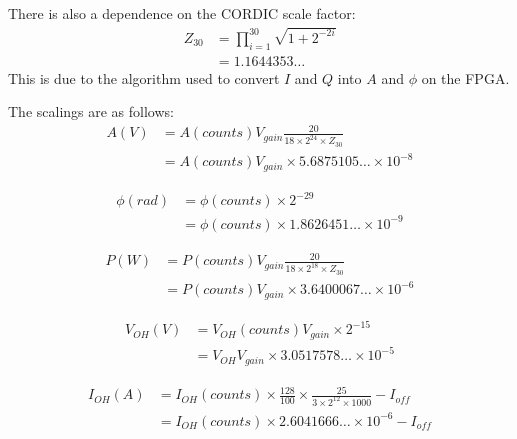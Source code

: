 \documentclass[12pt,a4paper]{article}
\begin{document}
There is also a dependence on the CORDIC scale factor:
\begin{equation}
  \label{equ:cordic}
  \begin{split}
    Z_{30} &= \prod_{i=1}^{30}\sqrt{1 + 2^{-2i}} \\
    &= 1.1644353\ldots
  \end{split}
\end{equation}
This is due to the algorithm used to convert $I$ and $Q$ into $A$ and $\phi$ on the FPGA\@.

The scalings are as follows:
\begin{equation}
  \label{equ:avolts}
  \begin{split}
    A(V) &= A(counts) V_{gain} \frac{20}{18 \times 2^{24} \times Z_{30}} \\
    &= A(counts) V_{gain} \times 5.6875105\ldots \times 10^{-8}
  \end{split}
\end{equation}

\begin{equation}
  \label{equ:phirad}
  \begin{split}
    \phi(rad) &= \phi(counts) \times 2^{-29} \\
    &= \phi(counts) \times 1.8626451\ldots \times 10^{-9}
  \end{split}
\end{equation}

\begin{equation}
  \label{equ:pwatts}
  \begin{split}
    P(W) &= P(counts) V_{gain} \frac{20}{18 \times 2^{18} \times Z_{30}} \\
    &= P(counts) V_{gain} \times 3.6400067\ldots \times 10^{-6}
  \end{split}
\end{equation}

\begin{equation}
  \label{equ:vdcvolts}
  \begin{split}
    V_{OH}(V) &= V_{OH}(counts) V_{gain} \times 2^{-15} \\
    &= V_{OH} V_{gain} \times 3.0517578\ldots \times 10^{-5}
  \end{split}
\end{equation}

\begin{equation}
  \label{equ:curramps}
  \begin{split}
    I_{OH}(A) &= I_{OH}(counts) \times \frac{128}{100} \times \frac{25}{3 \times 2^{12} \times 1000} - I_{off} \\
    &= I_{OH}(counts) \times 2.6041666\ldots \times 10^{-6} - I_{off}
  \end{split}
\end{equation}
\end{document}
